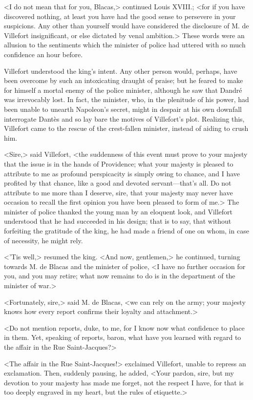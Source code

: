  <I do not mean that for you, Blacas,> continued Louis XVIII.; <for if you have discovered nothing, at least you have had the good sense to persevere in your suspicions. Any other than yourself would have considered the disclosure of M. de Villefort insignificant, or else dictated by venal ambition.> These words were an allusion to the sentiments which the minister of police had uttered with so much confidence an hour before. 

 Villefort understood the king's intent. Any other person would, perhaps, have been overcome by such an intoxicating draught of praise; but he feared to make for himself a mortal enemy of the police minister, although he saw that Dandré was irrevocably lost. In fact, the minister, who, in the plenitude of his power, had been unable to unearth Napoleon's secret, might in despair at his own downfall interrogate Dantès and so lay bare the motives of Villefort's plot. Realizing this, Villefort came to the rescue of the crest-fallen minister, instead of aiding to crush him. 

 <Sire,> said Villefort, <the suddenness of this event must prove to your majesty that the issue is in the hands of Providence; what your majesty is pleased to attribute to me as profound perspicacity is simply owing to chance, and I have profited by that chance, like a good and devoted servant—that's all. Do not attribute to me more than I deserve, sire, that your majesty may never have occasion to recall the first opinion you have been pleased to form of me.> The minister of police thanked the young man by an eloquent look, and Villefort understood that he had succeeded in his design; that is to say, that without forfeiting the gratitude of the king, he had made a friend of one on whom, in case of necessity, he might rely. 

 <'Tis well,> resumed the king. <And now, gentlemen,> he continued, turning towards M. de Blacas and the minister of police, <I have no further occasion for you, and you may retire; what now remains to do is in the department of the minister of war.> 

 <Fortunately, sire,> said M. de Blacas, <we can rely on the army; your majesty knows how every report confirms their loyalty and attachment.> 

 <Do not mention reports, duke, to me, for I know now what confidence to place in them. Yet, speaking of reports, baron, what have you learned with regard to the affair in the Rue Saint-Jacques?> 

 <The affair in the Rue Saint-Jacques!> exclaimed Villefort, unable to repress an exclamation. Then, suddenly pausing, he added, <Your pardon, sire, but my devotion to your majesty has made me forget, not the respect I have, for that is too deeply engraved in my heart, but the rules of etiquette.> 

